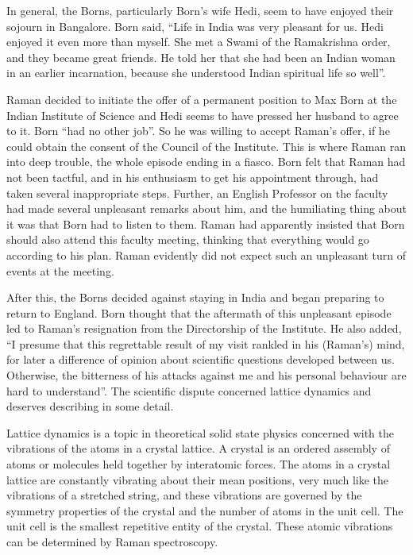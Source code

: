 In general, the Borns, particularly Born's wife Hedi, seem to have enjoyed their sojourn in Bangalore. Born said, ``Life in India was very pleasant for us. Hedi enjoyed it even more than myself. She met a Swami of the Ramakrishna order, and they became great friends. He told her that she had been an Indian woman in an earlier incarnation, because she understood Indian spiritual life so well''.

\newpage

Raman decided to initiate the offer of a permanent position to Max Born at the Indian Institute of Science and Hedi seems to have pressed her husband to agree to it. Born ``had no other job''. So he was willing to accept Raman's offer, if he could obtain the consent of the Council of the Institute. This is where Raman ran into deep trouble, the whole episode ending in a fiasco. Born felt that Raman had not been tactful, and in his enthusiasm to get his appointment through, had taken several inappropriate steps. Further, an English Professor on the faculty had made several unpleasant remarks about him, and the
humiliating thing about it was that Born had to listen to them. Raman had apparently insisted that Born should also attend this faculty meeting, thinking that everything would go according to his plan. Raman evidently did not expect such an unpleasant turn of events at the meeting.


After this, the Borns decided against staying in India and began preparing to return to England. Born thought that the aftermath of this unpleasant episode led to Raman's resignation from the Directorship of the Institute. He also added, ``I presume that this regrettable result of my visit rankled in his (Raman's) mind, for later a difference of opinion about scientific questions developed between us. Otherwise, the bitterness of his attacks against me and his personal behaviour are hard to understand''. The scientific dispute concerned lattice dynamics and deserves describing in some detail.

\medskip
{}
\smallskip

\noindent
Lattice dynamics is a topic in theoretical solid state physics concerned with the vibrations of the atoms in a crystal lattice. A crystal is an ordered assembly of atoms or molecules held together by interatomic forces. The atoms in a crystal lattice are constantly vibrating about their mean positions, very much like the vibrations of a stretched string, and these vibrations are governed by the symmetry properties of the crystal and the number of atoms in the unit cell. The unit cell is the smallest repetitive entity of the crystal. These atomic vibrations can be determined by Raman spectroscopy.

